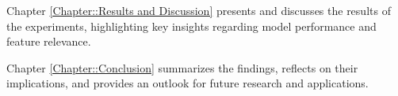 \documentclass[class=scrbook, crop=false]{standalone}
\begin{document}
Chapter \ref{Chapter::Results and Discussion} presents and discusses the results of the experiments, highlighting key insights regarding model performance and feature relevance.

Chapter  \ref{Chapter::Conclusion} summarizes the findings, reflects on their implications, and provides an outlook for future research and applications.





\ifstandalone
    \printglossary
    \printbibliography[heading=bibintoc]
\fi
\end{document}
